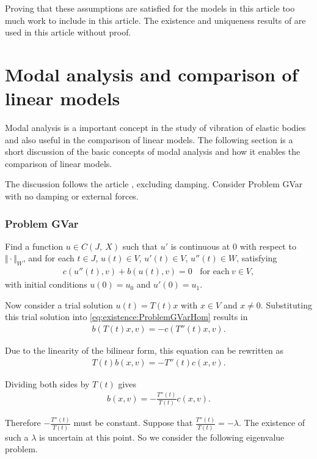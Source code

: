 Proving that these assumptions are satisfied for the models in this article too much work to 
include in this article. The existence and uniqueness results of \cite{VV02} are used in 
this article without proof.


\section{Modal analysis and comparison of linear models}
Modal analysis is a important concept in the study of vibration of elastic bodies and also 
useful in the comparison of linear models. The following section is a short discussion of 
the basic concepts of modal analysis and how it enables the comparison of linear models.

The discussion follows the article \cite{CVV18}, excluding damping. Consider Problem GVar with no damping or external forces.

\subsubsection*{Problem GVar}\label{sssec:existence:ProblemGVar}
Find a function $u \in C(J,\ X)$ such that $u'$ is continuous at $0$ with respect to $\Vert \cdot \Vert_{W}$, and for each $t \in J$, $u(t) \in V$, $u'(t) \in V$, $u''(t) \in W$, satisfying
\begin{eqnarray}
c(u''(t),v)+b(u(t),v) = 0 \ \ \ \ \textrm{for each} \ v \in V, \label{eq:existence:ProblemGVarHom}
\end{eqnarray}
with initial conditions $u(0) = u_0$ and $u'(0) = u_1$.

Now consider a trial solution $u(t) = T(t)x$ with $x \in V$ and $x \neq 0$. Substituting this trial solution into \eqref{eq:existence:ProblemGVarHom} results in
\begin{eqnarray*}
	b(T(t)x,v) = - c(T''(t)x,v).  \label{eq:existence:ProblemGVarHom:Substitution}
\end{eqnarray*}

Due to the linearity of the bilinear form, this equation can be rewritten as
\begin{eqnarray*}
	T(t)b(x,v) = - T''(t)c(x,v).
\end{eqnarray*}

Dividing both sides by $T(t)$ gives
\begin{eqnarray*}
	b(x,v) = - \frac{T''(t)}{T(t)}c(x,v).
\end{eqnarray*}

Therefore $\displaystyle -\frac{T''(t)}{T(t)}$ must be constant. Suppose that $\displaystyle \frac{T''(t)}{T(t)} = -\lambda$. The existence of such a $\lambda$ is uncertain at this point. So we consider the following eigenvalue problem.

